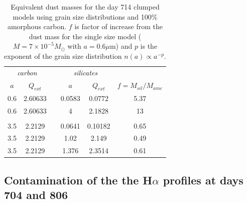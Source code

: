 \documentclass[useAMS,usenatbib,usegraphicx]{mnras}
\begin{document}
\begin{table}
	\caption{Equivalent dust masses for the day 714 clumped models using grain size distributions and 100\% amorphous carbon. $f$ is factor of increase from the dust mass for the single size model ($M=7 \times 10^{-5} M_{\odot}$ with $a=0.6 \mu$m) and $p$ is the exponent of the grain size distribution $n(a) \propto a^{-p}$.}
	\label{tb_sil}
	\begin{center}
  	\begin{tabular}{@{} cccccc @{}}
    	\hline
	\multicolumn{2}{c}{\textit{carbon}} && \multicolumn{2}{c}{\textit{silicates}} & \\
$a$ & $Q_{ext}$ & &$a$& $Q_{ext}$ & $f=M_{sil}/M_{amc}$ \\
\hline
0.6 & 2.60633 & &0.0583 & 0.0772 & 5.37 \\
0.6 & 2.60633 & &4 & 2.1828 & 13 \\
 \\
3.5 & 2.2129 & &0.0641 & 0.10182 & 0.65 \\
3.5 & 2.2129 & &1.02 & 2.149 & 0.49 \\
3.5 & 2.2129 & &1.376 & 2.3514 & 0.61 \\


    \hline
  \end{tabular}
  \end{center}
\end{table}

\subsection{Contamination of the the H$\alpha$ profiles at days 704 and 806}
\end{document}
